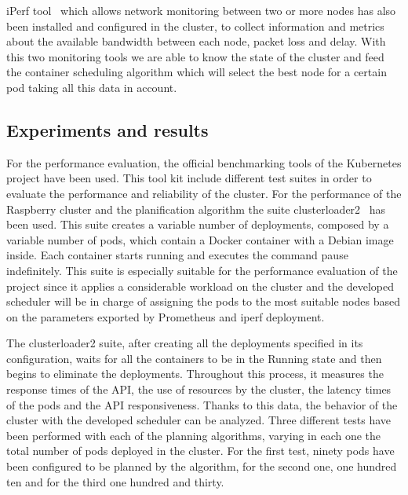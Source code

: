 \documentclass[conference]{IEEEtran}
\begin{document}
iPerf tool~\cite{iperf} which allows network monitoring between two or more nodes has also been installed and configured in the cluster, to collect information and metrics
about the available bandwidth between each node, packet loss and delay. With this two monitoring tools we are able to know the state of the cluster and feed the
container scheduling algorithm which will select the best node for a certain pod taking all this data in account.




\subsection{Experiments and results}\label{sec:expe}

For the performance evaluation, the official benchmarking tools of the Kubernetes project have been used. This tool kit include different test suites in order to evaluate the performance and reliability
of the cluster. For the performance of the Raspberry cluster and the planification algorithm the suite clusterloader2~\cite{clusterloader2}  has been used. This suite creates a variable number of deployments, composed by a variable number of pods, which contain a Docker container with a Debian image inside. Each container starts running and executes the command pause indefinitely. This suite is especially suitable for the performance evaluation of the project since it applies a considerable workload on the cluster and the developed scheduler will be in charge of assigning the pods to the most suitable nodes based on the parameters exported by Prometheus and iperf deployment.

The clusterloader2 suite, after creating all the deployments specified in its configuration, waits for all the containers to be in the Running state and then begins to eliminate the deployments.
Throughout this process, it measures the response times of the API, the use of resources by the cluster, the latency times of the pods and the API responsiveness. Thanks to this data,
the behavior of the cluster with the developed scheduler can be analyzed.
Three different tests have been performed with each of the planning algorithms, varying in each one the total number of pods deployed in the cluster. For the first test, ninety pods have been configured to be planned by the algorithm, for the second one, one hundred ten and for the third one hundred and thirty.
\end{document}
